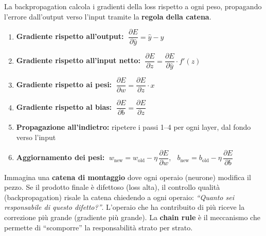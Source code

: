 \documentclass[
  11pt,
]{article}
\begin{document}
La backpropagation calcola i gradienti della loss rispetto a ogni peso, propagando l'errore dall'output verso l'input tramite la \textbf{regola della catena}.

\begin{formulabox}[title={\textbf{I 6 passi della Backpropagation}}]
\begin{enumerate}
\item \textbf{Gradiente rispetto all'output:} $\;\dfrac{\partial E}{\partial \hat{y}} = \hat{y} - y$
\item \textbf{Gradiente rispetto all'input netto:} $\;\dfrac{\partial E}{\partial z} = \dfrac{\partial E}{\partial \hat{y}} \cdot f'(z)$
\item \textbf{Gradiente rispetto ai pesi:} $\;\dfrac{\partial E}{\partial w} = \dfrac{\partial E}{\partial z} \cdot x$
\item \textbf{Gradiente rispetto al bias:} $\;\dfrac{\partial E}{\partial b} = \dfrac{\partial E}{\partial z}$
\item \textbf{Propagazione all'indietro:} ripetere i passi 1--4 per ogni layer, dal fondo verso l'input
\item \textbf{Aggiornamento dei pesi:} $\;w_{\text{new}} = w_{\text{old}} - \eta \,\dfrac{\partial E}{\partial w}$, $\;\;b_{\text{new}} = b_{\text{old}} - \eta \,\dfrac{\partial E}{\partial b}$
\end{enumerate}
\end{formulabox}

\begin{notabox}[title={\textbf{In parole semplici: la backpropagation come catena di montaggio}}]
Immagina una \textbf{catena di montaggio} dove ogni operaio (neurone) modifica il pezzo. Se il prodotto finale è difettoso (loss alta), il controllo qualità (backpropagation) risale la catena chiedendo a ogni operaio: \emph{``Quanto sei responsabile di questo difetto?''}. L'operaio che ha contribuito di più riceve la correzione più grande (gradiente più grande). La \textbf{chain rule} è il meccanismo che permette di ``scomporre'' la responsabilità strato per strato.
\end{notabox}
\end{document}
